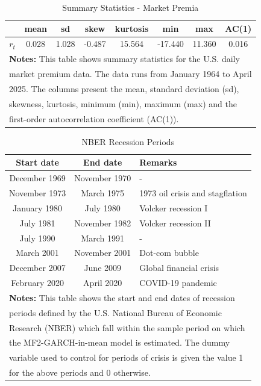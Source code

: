 \documentclass{article}
\begin{document}
\pagebreak
\begin{table}[t]
\centering
\caption{Summary Statistics - Market Premia}
\begin{tabular}{cccccccc}
\midrule
\midrule
\mbox{} & mean & sd & skew & kurtosis & min & max & AC(1)\\
\midrule
$r_t$ & 0.028 & 1.028 & -0.487 & 15.564 & -17.440 & 11.360 & 0.016\\
\midrule
\multicolumn{8}{l}{\textbf{Notes:} This table shows summary statistics for the U.S. daily}\\
\multicolumn{8}{l}{market premium data. The data runs from January 1964 to April}\\
\multicolumn{8}{l}{2025. The columns present the mean, standard deviation (sd),}\\
\multicolumn{8}{l}{skewness, kurtosis, minimum (min), maximum (max) and the}\\
\multicolumn{8}{l}{first-order autocorrelation coefficient (AC(1)).}\\
\midrule
\midrule
\end{tabular}
\end{table}

\pagebreak
\begin{table}
\centering
\caption{NBER Recession Periods}
\begin{tabular}{ccl}
\midrule
\midrule
Start date & End date & Remarks\\
\midrule
December 1969 & November 1970 & - \\
November 1973 & March 1975 & 1973 oil crisis and stagflation \\
January 1980 & July 1980 & Volcker recession I \\
July 1981 & November 1982 & Volcker recession II \\
July 1990 & March 1991 & - \\
March 2001 & November 2001 & Dot-com bubble \\
December 2007 & June 2009 & Global financial crisis \\
February 2020 & April 2020 & COVID-19 pandemic \\
\midrule
\multicolumn{3}{l}{\textbf{Notes:} This table shows the start and end dates of recession}\\
\multicolumn{3}{l}{periods defined by the U.S. National Bureau of Economic}\\
\multicolumn{3}{l}{Research (NBER) which fall within the sample period on which}\\
\multicolumn{3}{l}{the MF2-GARCH-in-mean model is estimated. The dummy}\\
\multicolumn{3}{l}{variable used to control for periods of crisis is given the value 1}\\
\multicolumn{3}{l}{for the above periods and 0 otherwise.}\\
\midrule
\midrule
\end{tabular}
\end{table}
\end{document}
